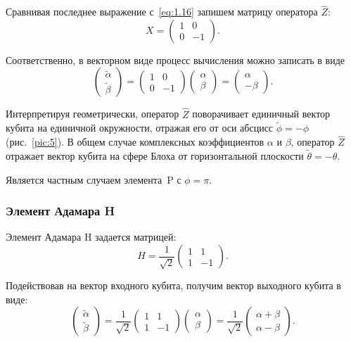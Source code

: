 \documentclass[pscyr,notitlepage]{hedwork}
\newcommand{\eq}[1]{\eqref{eq:#1}}
\newcommand{\pic}[1]{\ref{pic:#1}}
\renewcommand{\~}[1]{\widetilde{#1}}
\begin{document}
  Сравнивая последнее выражение с~\eq{1.16} запишем матрицу оператора
  \( \hat{Z} \):
  \[
    X =
    \begin{pmatrix}
      1 & 0 \\ 0 & -1
    \end{pmatrix}.
  \]
  
  Соответственно, в векторном виде процесс вычисления можно записать в виде
  \[
    \begin{pmatrix}
      \~\alpha \\ \~\beta
    \end{pmatrix} =
    \begin{pmatrix}
      1 & 0 \\ 0 & -1
    \end{pmatrix}
    \begin{pmatrix}
      \alpha \\ \beta
    \end{pmatrix} =
    \begin{pmatrix}
      \alpha \\ -\beta
    \end{pmatrix}.
  \]
  
  Интерпретируя геометрически, оператор \( \hat{Z} \) поворачивает единичный
  вектор кубита на единичной окружности, отражая его от оси абсцисс
  \( \~\phi = -\phi \) (рис.~\pic{5}). В общем случае комплексных коэффициентов
  \( \alpha \) и \( \beta \), оператор \( \hat{Z} \) отражает вектор кубита на
  сфере Блоха от горизонтальной плоскости \( \~\theta = -\theta \).
  
  Является частным случаем элемента~P с \( \phi = \pi \).~\cite{main,task}
  
  \subsubsection{Элемент Адамара H}
  Элемент Адамара H задается матрицей:
  \[
    H = \frac{1}{\sqrt{2}}
    \begin{pmatrix}
      1 & 1 \\ 1 & -1
    \end{pmatrix}.
  \]
  
  Подействовав на вектор входного кубита, получим вектор выходного кубита в
  виде:
  \[
    \begin{pmatrix}
      \~\alpha \\ \~\beta
    \end{pmatrix} = \frac{1}{\sqrt{2}}
    \begin{pmatrix}
      1 & 1 \\ 1 & -1
    \end{pmatrix}
    \begin{pmatrix}
      \alpha \\ \beta
    \end{pmatrix} = \frac{1}{\sqrt{2}}
    \begin{pmatrix}
      \alpha + \beta \\ \alpha - \beta
    \end{pmatrix}.
  \]
  
\end{document}
